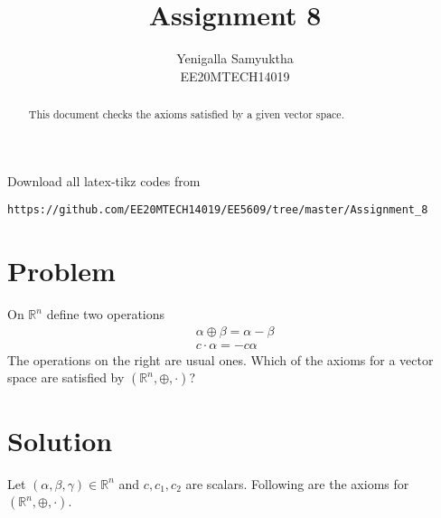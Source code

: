 \documentclass[journal,12pt,onecolumn]{IEEEtran}
\begin{document}
     \def\rightbox#1{\makebox[0in][r]{#1}}
     \def\centbox#1{\makebox[0in]{#1}}
     \def\topbox#1{\raisebox{-\baselineskip}[0in][0in]{#1}}
     \def\midbox#1{\raisebox{-0.5\baselineskip}[0in][0in]{#1}}
\vspace{3cm}
\title{Assignment 8}
\author{Yenigalla Samyuktha\\EE20MTECH14019}
\maketitle
\renewcommand{\thefigure}{\theenumi}
\renewcommand{\thetable}{\theenumi}
\begin{abstract}
This document checks the axioms satisfied by a given vector space.
\end{abstract}
Download all latex-tikz codes from 
%
\begin{lstlisting}
https://github.com/EE20MTECH14019/EE5609/tree/master/Assignment_8
\end{lstlisting}
%
\section{Problem}
On $\mathbb{R}^n$  define two operations
\begin{align}
\alpha\oplus\beta=\alpha-\beta\\
c\cdot\alpha=-c\alpha
\end{align}
The operations on the right are usual ones. Which of the axioms for a vector space are satisfied by $(\mathbb{R}^n,\oplus,\cdot)$?
\section{Solution}
Let $(\alpha,\beta,\gamma)\in \mathbb{R}^n$  and $c,c_1,c_2$ are scalars. Following are the axioms for $(\mathbb{R}^n,\oplus,\cdot)$.
\end{document}

